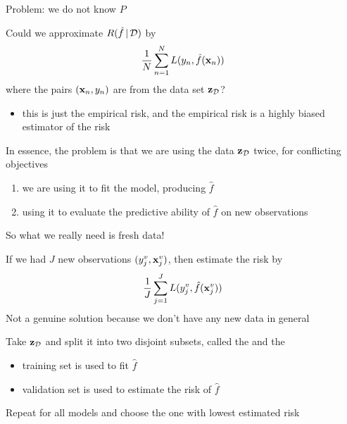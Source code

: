 \begin{frame}
    
    \vspace{2em}
    Problem: we do not know $P$ 
    
    \vspace{.7em}
    Could we approximate $R(\hat
    f \, | \, \mathcal D)$ by 
    \begin{equation*}
        \frac{1}{N} \sum_{n=1}^N L(y_n, \hat f({\mathbf x}_n)) 
    \end{equation*}
    where the pairs $({\mathbf x}_n, y_n)$ are from the data set $\mathbf{z}_{\mathcal D}$?
    \begin{itemize}
        \item this is just the empirical risk, and the empirical risk is a highly
        biased estimator of the risk
    \end{itemize}
    
\end{frame}

\begin{frame}
    
    \vspace{2em}
    In essence, the
    problem is that we are using the data $\mathbf{z}_{\mathcal D}$ twice, for conflicting
    objectives
    \begin{enumerate}
    \item we are using it to fit the model, producing $\hat f$
    \item using it to evaluate the predictive ability of $\hat f$ on new
        observations
    \end{enumerate}
    
    \vspace{.7em}
    So what we really need is fresh data!

\end{frame}

\begin{frame}

    \vspace{2em}
    If we had $J$ new observations $(y^v_j,
    {\mathbf x}^v_j)$, then estimate the risk by 
    \begin{equation*}
        \frac{1}{J} \sum_{j=1}^J L(y^v_j, \hat f({\mathbf x}^v_j)) 
    \end{equation*}
    Not a genuine solution because we don't have any new data in general
    
    \vspace{.7em}
    Take $\mathbf{z}_{\mathcal D}$
    and split it into two disjoint subsets, called the  and the
    
    \begin{itemize}
        \item training set is used to fit $\hat f$ 
        \item validation set is used to estimate the risk of $\hat f$
    \end{itemize}
    
    Repeat 
    for all models and choose the one with lowest estimated risk

\end{frame}


